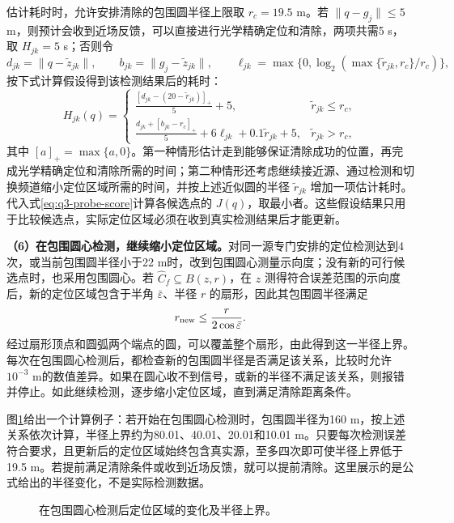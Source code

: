 估计耗时时，允许安排清除的包围圆半径上限取 $r_c=19.5$ m。若 $\|q-g_j\|\le5$ m，则预计会收到近场反馈，可以直接进行光学精确定位和清除，两项共需5 s，取 $H_{jk}=5$ s；否则令
\[
d_{jk}=\|q-\widetilde z_{jk}\|,\qquad
b_{jk}=\|g_j-\widetilde z_{jk}\|,\qquad
\ell_{jk}=\max\{0,\log_2(\max\{\widetilde r_{jk},r_c\}/r_c)\},
\]
按下式计算假设得到该检测结果后的耗时：
\begin{equation}\label{eq:q3-probe-future}
H_{jk}(q)=
\begin{cases}
\displaystyle\frac{[d_{jk}-(20-\widetilde r_{jk})]_+}{5}+5,
&\widetilde r_{jk}\le r_c,\\[5pt]
\displaystyle\frac{d_{jk}+[b_{jk}-r_c]_+}{5}
+6\ell_{jk}+0.1\widetilde r_{jk}+5,
&\widetilde r_{jk}>r_c,
\end{cases}
\end{equation}
其中 $[a]_+=\max\{a,0\}$。第一种情形估计走到能够保证清除成功的位置，再完成光学精确定位和清除所需的时间；第二种情形还考虑继续接近源、通过检测和切换频道缩小定位区域所需的时间，并按上述近似圆的半径 $\widetilde r_{jk}$ 增加一项估计耗时。代入式\eqref{eq:q3-probe-score}计算各候选点的 $J(q)$，取最小者。这些假设结果只用于比较候选点，实际定位区域必须在收到真实检测结果后才能更新。

\textbf{（6）在包围圆心检测，继续缩小定位区域。}对同一源专门安排的定位检测达到4次，或当前包围圆半径小于22 m时，改到包围圆心测量示向度；没有新的可行候选点时，也采用包围圆心。若 $\widehat C_f\subseteq B(z,r)$，在 $z$ 测得符合误差范围的示向度后，新的定位区域包含于半角 $\bar\varepsilon$、半径 $r$ 的扇形，因此其包围圆半径满足
\begin{equation}\label{eq:q3-center-contraction}
r_{\rm new}\le\frac{r}{2\cos\bar\varepsilon}.
\end{equation}
经过扇形顶点和圆弧两个端点的圆，可以覆盖整个扇形，由此得到这一半径上界。每次在包围圆心检测后，都检查新的包围圆半径是否满足该关系，比较时允许 $10^{-3}$ m的数值差异。如果在圆心收不到信号，或新的半径不满足该关系，则报错并停止。如此继续检测，逐步缩小定位区域，直到满足清除距离条件。

图\ref{fig:q3-contraction}给出一个计算例子：若开始在包围圆心检测时，包围圆半径为160 m，按上述关系依次计算，半径上界约为80.01、40.01、20.01和10.01 m。只要每次检测误差符合要求，且更新后的定位区域始终包含真实源，至多四次即可使半径上界低于19.5 m。若提前满足清除条件或收到近场反馈，就可以提前清除。这里展示的是公式给出的半径变化，不是实际检测数据。

\begin{figure}[!htbp]
\centering
\QThreeContractionFigure
\caption{在包围圆心检测后定位区域的变化及半径上界。}
\label{fig:q3-contraction}
\end{figure}


